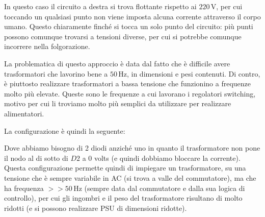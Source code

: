 \documentclass[a4paper,11pt]{article}
\begin{document}
In questo caso il circuito a destra si trova flottante rispetto ai $220 \, \mathrm{V}$, per cui toccando un qualsiasi punto non viene imposta alcuna corrente attraverso il corpo umano. Questo chiaramente finché si tocca un solo punto del circuito: più punti possono comunque trovarsi a tensioni diverse, per cui si potrebbe comunque incorrere nella folgorazione.

La problematica di questo approccio è data dal fatto che è difficile avere trasformatori che lavorino bene a $50 \, \mathrm{Hz}$, in dimensioni e pesi contenuti. Di contro, è piuttosto realizzare trasformatori a bassa tensione che funzionino a frequenze molto più elevate. Queste sono le frequenze a cui lavorano i regolatori switching, motivo per cui li troviamo molto più semplici da utilizzare per realizzare alimentatori. 

La configurazione è quindi la seguente:
\begin{center}
\end{center}

Dove abbiamo bisogno di 2 diodi anziché uno in quanto il trasformatore non pone il nodo al di sotto di $D2$ a 0 volts (e quindi dobbiamo bloccare la corrente). Questa configurazione permette quindi di impiegare un trasformatore, su una tensione che è sempre variabile in AC (si trova a valle del commutatore), ma che ha frequenza $>> 50 \, \mathrm{Hz}$ (sempre data dal commutatore e dalla sua logica di controllo), per cui gli ingombri e il peso del trasformatore risultano di molto ridotti (e si possono realizzare PSU di dimensioni ridotte). 
\end{document}
